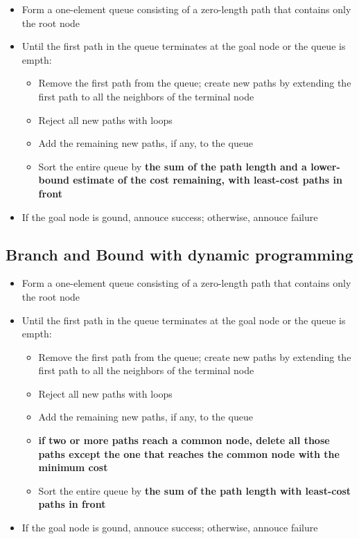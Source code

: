 \begin{itemize}
  \item Form a one-element queue consisting of a zero-length path 
    that contains only the root node
  \item Until the first path in the queue terminates at the 
    goal node or the queue is empth:
    \begin{itemize}
      \item Remove the first path from the queue; create new paths 
        by extending the first path to all the neighbors
        of the terminal node
      \item Reject all new paths with loops
      \item Add the remaining new paths, if any, to the queue
      \item Sort the entire queue by \textbf{the sum of the path
        length and a lower-bound estimate of the cost
        remaining, with least-cost paths in front}
    \end{itemize}
  \item If the goal node is gound, annouce success; otherwise, 
    annouce failure
\end{itemize}

\subsection{Branch and Bound with dynamic programming}

\begin{itemize}
  \item Form a one-element queue consisting of a zero-length path 
    that contains only the root node
  \item Until the first path in the queue terminates at the 
    goal node or the queue is empth:
    \begin{itemize}
      \item Remove the first path from the queue; create new paths 
        by extending the first path to all the neighbors
        of the terminal node
      \item Reject all new paths with loops
      \item Add the remaining new paths, if any, to the queue
      \item \textbf{if two or more paths reach a common node,
        delete all those paths except the one that reaches the
        common node with the minimum cost}
      \item Sort the entire queue by \textbf{the sum of the path
        length with least-cost paths in front}
    \end{itemize}
  \item If the goal node is gound, annouce success; otherwise, 
    annouce failure
\end{itemize}

